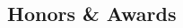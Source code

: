 \documentclass{article}
\begin{document}
\begin{spacing}{.5}
\begin{comment}
		\subsection{Fall 2020}
			\begin{itemize}
				\item CENG-3203 Intro to Microprocessors
				\item ELEC-3504 Signals and Systems
				\item ELEC-3303 Analog Electronics
			\end{itemize}
		\subsection{Spring 2020}
			\begin{itemize}
				\item ENGR-2614 Electrical Circuit Analysis
				\item ENGR-2123 ECE Mathematics II
			\end{itemize}
		\subsection{Fall 2019}
			\begin{itemize}
				\item ENGR-2544 Introductory Digital Systems Design
				\item CMSC-2133 Object Oriented Programming
			\end{itemize}
		\subsection{Spring 2019}
			\begin{itemize}
				\item ENGR-2113 ECE Mathematics I
				\item ENGR-1242 Engineering Fundamentals
				\item CMSC-1123 Programming II
			\end{itemize}
		\subsection{Fall 2018}
			\begin{itemize}
				\item CMSC-1113 Programming I
				\item ENGR-1122 Engineering Computing
			\end{itemize}
\end{comment}

\section{Honors \& Awards}

\end{spacing}
\end{document}
